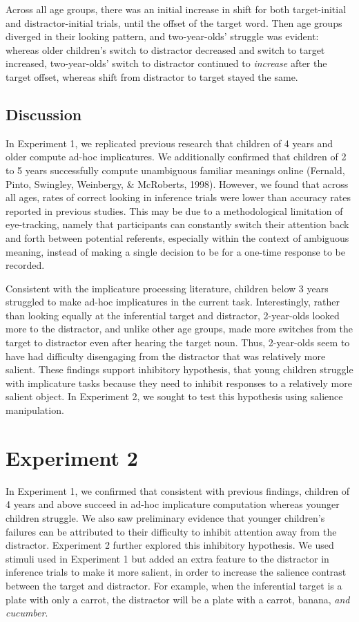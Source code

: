 \documentclass[a4paper,man,apacite,floatsintext]{apa6}
\begin{document}
Across all age groups, there was an initial increase in shift for both
target-initial and distractor-initial trials, until the offset of the
target word. Then age groups diverged in their looking pattern, and
two-year-olds' struggle was evident: whereas older children's switch to
distractor decreased and switch to target increased, two-year-olds'
switch to distractor continued to \emph{increase} after the target
offset, whereas shift from distractor to target stayed the same.

\subsection{Discussion}\label{discussion}

In Experiment 1, we replicated previous research that children of 4
years and older compute ad-hoc implicatures. We additionally confirmed
that children of 2 to 5 years successfully compute unambiguous familiar
meanings online (Fernald, Pinto, Swingley, Weinbergy, \& McRoberts,
1998). However, we found that across all ages, rates of correct looking
in inference trials were lower than accuracy rates reported in previous
studies. This may be due to a methodological limitation of eye-tracking,
namely that participants can constantly switch their attention back and
forth between potential referents, especially within the context of
ambiguous meaning, instead of making a single decision to be for a
one-time response to be recorded.

Consistent with the implicature processing literature, children below 3
years struggled to make ad-hoc implicatures in the current task.
Interestingly, rather than looking equally at the inferential target and
distractor, 2-year-olds looked more to the distractor, and unlike other
age groups, made more switches from the target to distractor even after
hearing the target noun. Thus, 2-year-olds seem to have had difficulty
disengaging from the distractor that was relatively more salient. These
findings support inhibitory hypothesis, that young children struggle
with implicature tasks because they need to inhibit responses to a
relatively more salient object. In Experiment 2, we sought to test this
hypothesis using salience manipulation.

\section{Experiment 2}\label{experiment-2}

In Experiment 1, we confirmed that consistent with previous findings,
children of 4 years and above succeed in ad-hoc implicature computation
whereas younger children struggle. We also saw preliminary evidence that
younger children's failures can be attributed to their difficulty to
inhibit attention away from the distractor. Experiment 2 further
explored this inhibitory hypothesis. We used stimuli used in Experiment
1 but added an extra feature to the distractor in inference trials to
make it more salient, in order to increase the salience contrast between
the target and distractor. For example, when the inferential target is a
plate with only a carrot, the distractor will be a plate with a carrot,
banana, \emph{and cucumber}.
\end{document}
